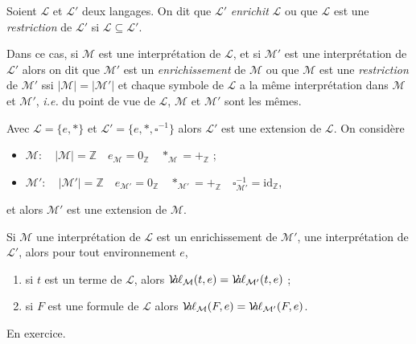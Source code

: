 \documentclass[./main]{subfiles}
\begin{document}
  \begin{defn}
    Soient $\mathcal{L}$ et $\mathcal{L}'$ deux langages. On dit que $\mathcal{L}'$ \textit{enrichit} $\mathcal{L}$ ou que $\mathcal{L}$ est une \textit{restriction}  de $\mathcal{L}'$  si $\mathcal{L} \subseteq \mathcal{L}'$.

    Dans ce cas, si $\mathcal{M}$ est une interprétation de $\mathcal{L}$, et si $\mathcal{M}'$ est une interprétation de $\mathcal{L}'$ alors on dit que $\mathcal{M}'$ est un \textit{enrichissement} de $\mathcal{M}$ ou que $\mathcal{M}$ est une \textit{restriction} de $\mathcal{M}'$ ssi $|\mathcal{M}| = |\mathcal{M}'|$ et chaque symbole de $\mathcal{L}$ a la même interprétation dans $\mathcal{M}$ et $\mathcal{M}'$, \textit{i.e.} du point de vue de $\mathcal{L}$, $\mathcal{M}$ et $\mathcal{M}'$ sont les mêmes.
  \end{defn}

  \begin{exm}
    Avec $\mathcal{L} = \{e, *\}$ et $\mathcal{L}' = \{e, *, \square^{-1}\}$ alors $\mathcal{L}'$ est une extension de $\mathcal{L}$.
    On considère 
    \begin{itemize}
      \item $\mathcal{M} : \quad |\mathcal{M}| = \mathds{Z} \quad e_\mathcal{M} = 0_\mathds{Z} \quad *_\mathcal{M} = +_\mathds{Z}$ ;
      \item $\mathcal{M}' : \quad |\mathcal{M}'| = \mathds{Z} \quad e_\mathcal{M'} = 0_\mathds{Z} \quad *_\mathcal{M'} = +_\mathds{Z} \quad \square^{-1}_\mathcal{M'} = \mathrm{id}_\mathds{Z}$,
    \end{itemize}
    et alors $\mathcal{M}'$ est une extension de $\mathcal{M}$.
  \end{exm}

  \begin{prop}
    Si $\mathcal{M}$ une interprétation de $\mathcal{L}$ est un enrichissement de $\mathcal{M}'$, une interprétation de $\mathcal{L}'$, alors pour tout environnement $e$, 
    \begin{enumerate}
      \item si $t$ est un terme de $\mathcal{L}$, alors $\mathcal{V}\hspace{-3.5pt}a\hspace{-0.5pt}\ell_\mathcal{M}(t, e) = \mathcal{V}\hspace{-3.5pt}a\hspace{-0.5pt}\ell_{\mathcal{M}'}(t, e)$ ;
      \item si $F$ est une formule de $\mathcal{L}$ alors $\mathcal{V}\hspace{-3.5pt}a\hspace{-0.5pt}\ell_\mathcal{M}(F, e) = \mathcal{V}\hspace{-3.5pt}a\hspace{-0.5pt}\ell_\mathcal{M'}(F, e)$.
    \end{enumerate}
  \end{prop}
  \begin{prv}
    En exercice.
  \end{prv}
\end{document}
